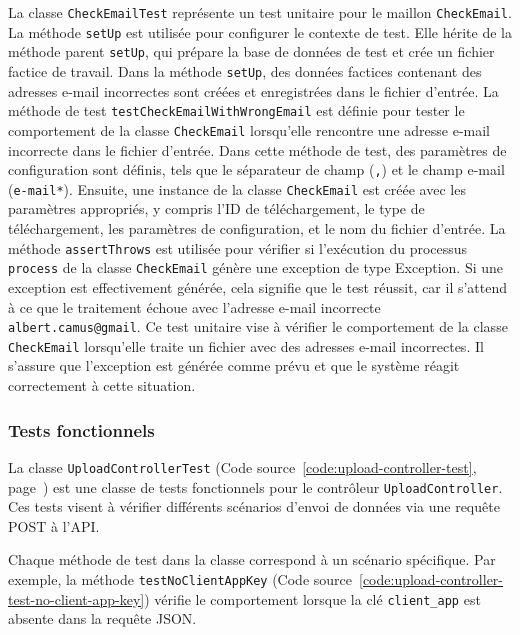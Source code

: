 La classe \Verb|CheckEmailTest| représente un test unitaire pour le maillon \Verb|CheckEmail|. La méthode \Verb|setUp| est utilisée pour configurer le contexte de test. Elle hérite de la méthode parent \Verb|setUp|, qui prépare la base de données de test et crée un fichier factice de travail. Dans la méthode \Verb|setUp|, des données factices contenant des adresses e-mail incorrectes sont créées et enregistrées dans le fichier d'entrée. La méthode de test \Verb|testCheckEmailWithWrongEmail| est définie pour tester le comportement de la classe \Verb|CheckEmail| lorsqu'elle rencontre une adresse e-mail incorrecte dans le fichier d'entrée. Dans cette méthode de test, des paramètres de configuration sont définis, tels que le séparateur de champ (\Verb|,|) et le champ e-mail (\Verb|e-mail*|). Ensuite, une instance de la classe \Verb|CheckEmail| est créée avec les paramètres appropriés, y compris l'ID de téléchargement, le type de téléchargement, les paramètres de configuration, et le nom du fichier d'entrée. La méthode \Verb|assertThrows| est utilisée pour vérifier si l'exécution du processus \Verb|process| de la classe \Verb|CheckEmail| génère une exception de type Exception. Si une exception est effectivement générée, cela signifie que le test réussit, car il s'attend à ce que le traitement échoue avec l'adresse e-mail incorrecte \Verb|albert.camus@gmail|. Ce test unitaire vise à vérifier le comportement de la classe \Verb|CheckEmail| lorsqu'elle traite un fichier avec des adresses e-mail incorrectes. Il s'assure que l'exception est générée comme prévu et que le système réagit correctement à cette situation.

\subsubsection{Tests fonctionnels}\label{subsubsec:functional-tests}

La classe \Verb|UploadControllerTest| (Code source~\ref{code:upload-controller-test}, page~\pageref{code:upload-controller-test}) est une classe de tests fonctionnels pour le contrôleur \Verb|UploadController|. Ces tests visent à vérifier différents scénarios d'envoi de données via une requête POST à l'API.

Chaque méthode de test dans la classe correspond à un scénario spécifique. Par exemple, la méthode \Verb|testNoClientAppKey| (Code source~\ref{code:upload-controller-test-no-client-app-key}) vérifie le comportement lorsque la clé \Verb|client_app| est absente dans la requête JSON.

